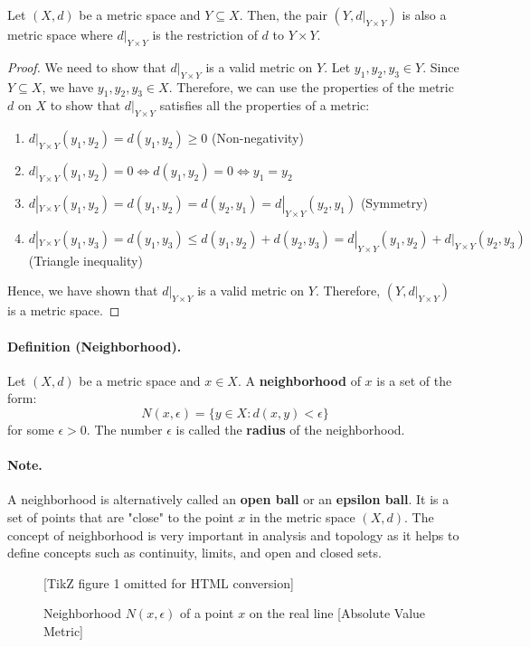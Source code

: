 \documentclass[openany]{book}
\numberwithin{equation}{section}
\begin{document}
    Let $(X, d)$ be a metric space and $Y \subseteq X$. Then, the pair $(Y, d|_{Y \times Y})$ is also a metric space where $d|_{Y \times Y}$ is the restriction of $d$ to $Y \times Y$.
\par
\begin{proof}
    We need to show that $d|_{Y \times Y}$ is a valid metric on $Y$. Let $y_1, y_2, y_3 \in Y$. Since $Y \subseteq X$, we have $y_1, y_2, y_3 \in X$. Therefore, we can use the properties of the metric $d$ on $X$ to show that $d|_{Y \times Y}$ satisfies all the properties of a metric:
    \begin{enumerate}
        \item $d|_{Y \times Y}(y_1, y_2) = d(y_1, y_2) \geq 0$ (Non-negativity)
        \item $d|_{Y \times Y}(y_1, y_2) = 0 \iff d(y_1, y_2) = 0 \iff y_1 = y_2$ 
        \item $d|_{Y \times Y}(y_1, y_2) = d(y_1, y_2) = d(y_2, y_1) = d|_{Y \times Y}(y_2, y_1)$ (Symmetry)
        \item $d|_{Y \times Y}(y_1, y_3) = d(y_1, y_3) \leq d(y_1, y_2) + d(y_2, y_3) = d|_{Y \times Y}(y_1, y_2) + d|_{Y \times Y}(y_2, y_3)$ (Triangle inequality)
    \end{enumerate}
    Hence, we have shown that $d|_{Y \times Y}$ is a valid metric on $Y$. Therefore, $(Y, d|_{Y \times Y})$ is a metric space.
\end{proof}
\paragraph{Definition (Neighborhood).}

    Let $(X, d)$ be a metric space and $x \in X$. A \textbf{neighborhood} of $x$ is a set of the form:
    $$N(x, \epsilon) = \{y \in X: d(x, y) < \epsilon\}$$
    for some $\epsilon > 0$. The number $\epsilon$ is called the \textbf{radius} of the neighborhood.
\par
\paragraph{Note.}

    A neighborhood is alternatively called an \textbf{open ball} or an \textbf{epsilon ball}. It is a set of points that are "close" to the point $x$ in the metric space $(X, d)$. The concept of neighborhood is very important in analysis and topology as it helps to define concepts such as continuity, limits, and open and closed sets.
\par
\begin{figure}[H]
    \centering
    

[TikZ figure 1 omitted for HTML conversion]

    \caption{Neighborhood $N(x, \epsilon)$ of a point $x$ on the real line [Absolute Value Metric]}
\end{figure}
\end{document}

